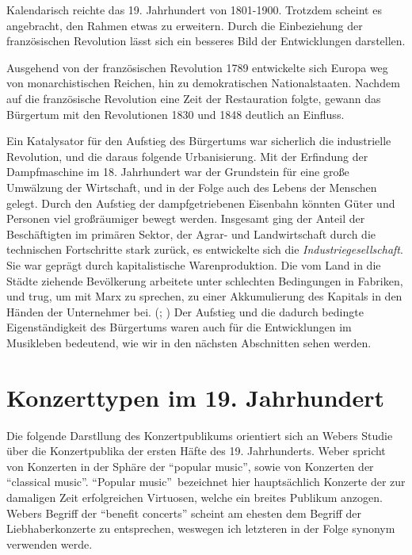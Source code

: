 \documentclass[a4paper, german, oneside]{scrbook}
\newcommand{\citep}[1]{\parencite{#1}}
\begin{document}
Kalendarisch reichte das 19. Jahrhundert von 1801-1900. Trotzdem scheint es angebracht, den Rahmen etwas zu erweitern. Durch die Einbeziehung der französischen Revolution lässt sich ein besseres Bild der Entwicklungen darstellen.

Ausgehend von der französischen Revolution 1789 entwickelte sich Europa weg von monarchistischen Reichen, hin zu demokratischen Nationalstaaten. Nachdem auf die französische Revolution eine Zeit der Restauration folgte, gewann das Bürgertum mit den Revolutionen 1830 und 1848 deutlich an Einfluss. \parencite[vgl.][253ff.]{demandt_kleine_2003}

Ein Katalysator für den Aufstieg des Bürgertums war sicherlich die industrielle Revolution, und die daraus folgende Urbanisierung. Mit der Erfindung der Dampfmaschine im 18. Jahrhundert war der Grundstein für eine große Umwälzung der Wirtschaft, und in der Folge auch des Lebens der Menschen gelegt. Durch den Aufstieg der dampfgetriebenen Eisenbahn könnten Güter und Personen viel großräumiger bewegt werden. Insgesamt ging der Anteil der Beschäftigten im primären Sektor, der Agrar- und Landwirtschaft durch die technischen Fortschritte stark zurück, es entwickelte sich die \emph{Industriegesellschaft}. Sie war geprägt durch kapitalistische Warenproduktion. Die vom Land in die Städte ziehende Bevölkerung arbeitete unter schlechten Bedingungen in Fabriken, und trug, um mit Marx zu sprechen, zu einer Akkumulierung des Kapitals in den Händen der Unternehmer bei. (\cite{marx_kapital:_1989}; \cite[368]{hillmann_worterbuch_2007}) Der Aufstieg und die dadurch bedingte Eigenständigkeit des Bürgertums waren auch für die Entwicklungen im Musikleben bedeutend, wie wir in den nächsten Abschnitten sehen werden.


\section{Konzerttypen im 19. Jahrhundert}
\label{konzerttypen}
Die folgende Darstllung des Konzertpublikums orientiert sich an Webers Studie über die Konzertpublika der ersten Häfte des 19. Jahrhunderts. \citep{weber_music_2004} Weber spricht von Konzerten in der Sphäre der \enquote{popular music}, sowie von Konzerten der \enquote{classical music}. \enquote{Popular music} bezeichnet hier hauptsächlich Konzerte der zur damaligen Zeit erfolgreichen Virtuosen, welche ein breites Publikum anzogen. Webers Begriff der \enquote{benefit concerts} scheint am ehesten dem Begriff der Liebhaberkonzerte zu entsprechen, weswegen ich letzteren in der Folge synonym verwenden werde. 
\end{document}
